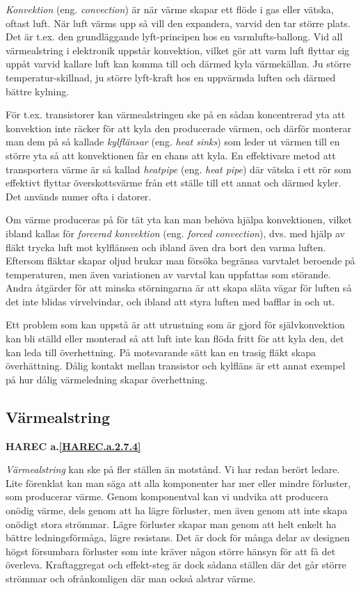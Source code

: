 \emph{Konvektion} (eng. \emph{convection}) är när värme skapar ett flöde i
gas eller vätska, oftast luft. När luft värms upp så vill den expandera, varvid
den tar större plats. Det är t.ex. den grundläggande lyft-principen hos en
varmlufts-ballong. Vid all värmealstring i elektronik uppstår konvektion, vilket
gör att varm luft flyttar sig uppåt varvid kallare luft kan komma till och
därmed kyla värmekällan. Ju större temperatur-skillnad, ju större lyft-kraft
hos en uppvärmda luften och därmed bättre kylning.

För t.ex. transistorer kan värmealstringen ske på en sådan koncentrerad yta att
konvektion inte räcker för att kyla den producerade värmen, och därför monterar
man dem på så kallade \emph{kylflänsar} (eng. \emph{heat sinks}) som leder ut
värmen till en större yta så att konvektionen får en chans att kyla.
En effektivare metod att transportera värme är så kallad \emph{heatpipe} (eng.
\emph{heat pipe}) där vätska i ett rör som effektivt flyttar överskottsvärme
från ett ställe till ett annat och därmed kyler. Det används numer ofta i
datorer.

Om värme produceras på för tät yta kan man behöva hjälpa konvektionen, vilket
ibland kallas för \emph{forcerad konvektion} (eng. \emph{forced convection}),
dvs. med hjälp av fläkt trycka luft mot kylflänsen och ibland även dra bort
den varma luften. Eftersom fläktar skapar oljud brukar man försöka begränsa
varvtalet beroende på temperaturen, men även variationen av varvtal kan
uppfattas som störande. Andra åtgärder för att minska störningarna är att
skapa släta vägar för luften så det inte blidas virvelvindar, och ibland att
styra luften med bafflar in och ut.

Ett problem som kan uppstå är att utrustning som är gjord för självkonvektion
kan bli ställd eller monterad så att luft inte kan flöda fritt för att kyla
den, det kan leda till överhettning. På motsvarande sätt kan en trasig fläkt
skapa överhättning. Dålig kontakt mellan transistor och kylfläns är ett annat
exempel på hur dålig värmeledning skapar överhettning.

\subsection{Värmealstring}
\textbf{
HAREC a.\ref{HAREC.a.2.7.4}\label{myHAREC.a.2.7.4}
}

\emph{Värmealstring} kan ske på fler ställen än motstånd. Vi har redan berört
ledare. Lite förenklat kan man säga att alla komponenter har mer eller mindre
förluster, som producerar värme. Genom komponentval kan vi undvika att
producera onödig värme, dels genom att ha lägre förluster, men även genom att
inte skapa onödigt stora strömmar. Lägre förluster skapar man genom att helt
enkelt ha bättre ledningsförmåga, lägre resistans. Det är dock för många
delar av designen högst försumbara förluster som inte kräver någon större
hänsyn för att få det överleva. Kraftaggregat och effekt-steg är dock sådana
ställen där det går större strömmar och ofrånkomligen där man också alstrar
värme.


